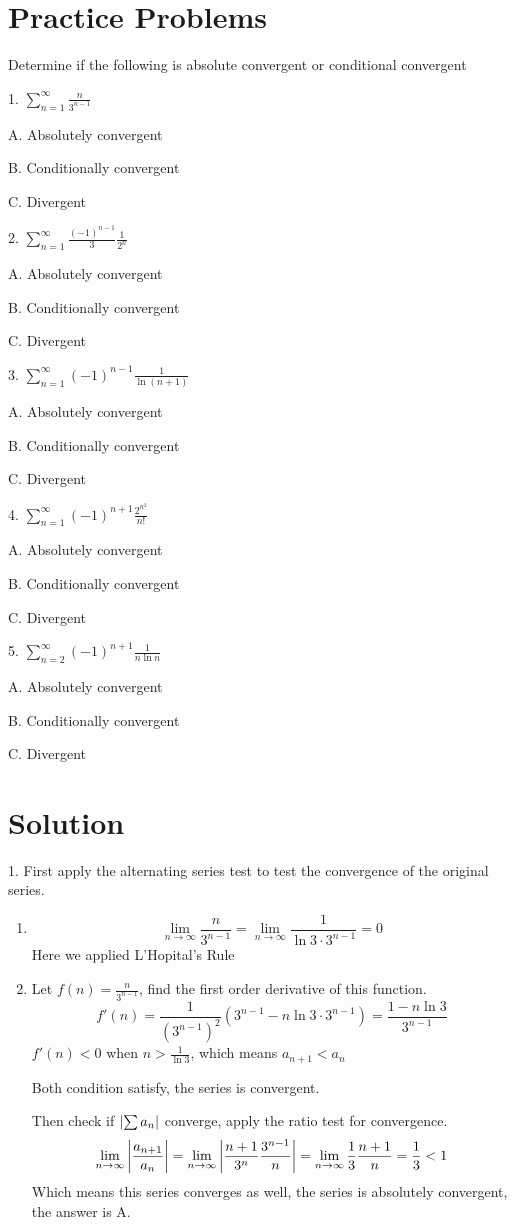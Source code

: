 \documentclass{article}
\numberwithin{equation}{section}
\begin{document}
\newpage
\section{Practice Problems}
Determine if the following is absolute convergent or conditional convergent 

1. $\displaystyle \sum_{n=1}^{\infty} \frac{n}{3^{n-1}}$

A. Absolutely convergent

B. Conditionally convergent

C. Divergent

2. $\displaystyle \sum_{n=1}^{\infty} \frac{(-1)^{n-1}}{3} \frac{1}{2^n}$

A. Absolutely convergent

B. Conditionally convergent

C. Divergent

3. $\displaystyle \sum_{n=1}^{\infty} (-1)^{n-1} \frac{1}{\ln(n+1)}$

A. Absolutely convergent

B. Conditionally convergent

C. Divergent

4. $\displaystyle \sum_{n=1}^{\infty} (-1)^{n+1} \frac{2^{n^2}}{n!}$

A. Absolutely convergent

B. Conditionally convergent

C. Divergent

5. $\displaystyle \sum_{n=2}^{\infty} (-1)^{n+1} \frac{1}{n\ln n}$

A. Absolutely convergent

B. Conditionally convergent

C. Divergent

\newpage
\section{Solution}
1. First apply the alternating series test to test the convergence of the original series.
\begin{enumerate}
    \item 
    \[
    \lim_{n\to\infty} \frac{n}{3^{n-1}} = \lim_{n\to\infty} \frac{1}{\ln 3 \cdot 3^{n-1}} = 0
    \]
    Here we applied L'Hopital's Rule
    \item Let $\displaystyle f(n) = \frac{n}{3^{n-1}}$, find the first order derivative of this function.
    \[
    f'(n) = \frac{1}{\left(3^{n-1}\right)^2} \left(3^{n-1} - n\ln 3 \cdot 3^{n-1}\right) = \frac{1 - n\ln 3}{3^{n-1}}
    \]
    $f'(n) < 0$ when $\displaystyle n > \frac{1}{\ln 3}$, which means $a_{n+1} < a_n$

    Both condition satisfy, the series is convergent.

    Then check if $\abs{\sum a_n}$ converge, apply the ratio test for convergence.
    \[
    \lim_{n\to\infty} \abs{\frac{a_{n+1}}{a_n}} = \lim_{n\to\infty} \abs{\frac{n+1}{3^n} \frac{3^{n-1}}{n}} = \lim_{n\to\infty} \frac{1}{3} \frac{n+1}{n} = \frac{1}{3} < 1
    \]
    Which means this series converges as well, the series is absolutely convergent, the answer is A.
\end{enumerate}
\end{document}
